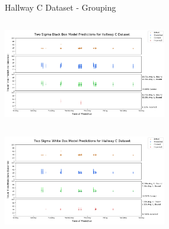 \documentclass{beamer}
\begin{document}
\begin{frame}[t]{Hallway C Dataset - Grouping}

  \vspace*{-0.9cm}
  \begin{columns}[t]
    {\includegraphics[width = 2.8in]{images/hallway/two_sigma_black_box_model_predictions_for_hallway_c_dataset.png}}

    \begin{overlayarea}{0.5\textwidth}{0.5\textheight}


    \end{overlayarea}
  \end{columns}
  \vspace*{-0.3cm}

  \begin{columns}[t]
    {\includegraphics[width = 2.8in]{images/hallway/two_sigma_white_box_model_predictions_for_hallway_c_dataset.png}}
  \end{columns}

\end{frame}
\end{document}
